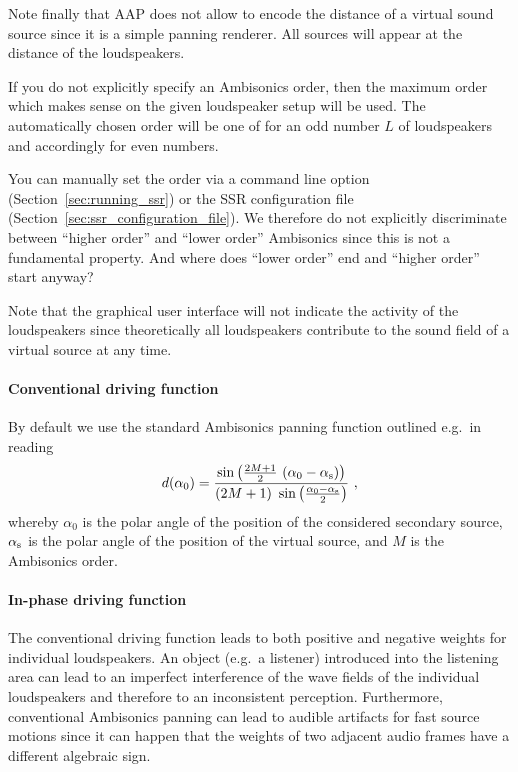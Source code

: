 Note finally that AAP does not allow to encode the distance of a virtual sound
source since it is a simple panning renderer. All sources will appear at the
distance of the loudspeakers.

If you do not explicitly specify an Ambisonics order, then the maximum order
which makes sense on the given loudspeaker setup will be used. The
automatically chosen order will be one of  for an odd number
$L$ of loudspeakers and accordingly for even numbers.

You can manually set the order via a command line option
(Section~\ref{sec:running_ssr}) or the SSR configuration file
(Section~\ref{sec:ssr_configuration_file}). We therefore do not explicitly
discriminate between ``higher order'' and ``lower order'' Ambisonics since this
is not a fundamental property. And where does ``lower order'' end and ``higher
order'' start anyway?

Note that the graphical user interface will not indicate the activity of the
loudspeakers since theoretically all loudspeakers contribute to the sound field
of a virtual source at any time.

\paragraph{Conventional driving function}

By default we use the standard Ambisonics panning function outlined e.g.~in
\cite{Neukom07} reading
%
\begin{equation}
d(\alpha_0)  = \frac{\sin\left ( \frac{2M+1}{2} \ (\alpha_0 -
\alpha_\textnormal{s})\right )} {(2M+1) \ \sin \left ( \frac{\alpha_0 -
\alpha_\textnormal{s}}{2} \right ) } \ , \nonumber
\end{equation}
%
whereby $\alpha_0$ is the polar angle of the position of the considered secondary source,
$\alpha_\textnormal{s}$ is the polar angle of the position of the virtual source, and
$M$ is the Ambisonics order.

\paragraph{In-phase driving function}

The conventional driving function leads to both positive and negative weights
for individual loudspeakers. An object (e.g.~a listener) introduced into the
listening area can lead to an imperfect interference of the wave fields of the
individual loudspeakers and therefore to an inconsistent perception.
Furthermore, conventional Ambisonics panning can lead to audible artifacts for
fast source motions since it can happen that the weights of two adjacent audio
frames have a different algebraic sign.

